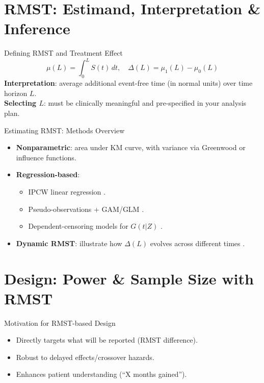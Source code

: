 \documentclass{beamer}
\begin{document}
\section{RMST: Estimand, Interpretation \& Inference}

\begin{frame}{Defining RMST and Treatment Effect}
\[
\mu(L)=\int_0^L S(t)\,dt,\quad \Delta(L)=\mu_1(L)-\mu_0(L)
\]
\textbf{Interpretation}: average additional event-free time (in normal units) over time horizon \(L\).\\
\textbf{Selecting \(L\)}: must be clinically meaningful and pre-specified in your analysis plan.
\end{frame}

\begin{frame}{Estimating RMST: Methods Overview}
\begin{itemize}
  \item \textbf{Nonparametric}: area under KM curve, with variance via Greenwood or influence functions.
  \item \textbf{Regression-based}:
    \begin{itemize}
      \item IPCW linear regression \cite{Tian2014}.
      \item Pseudo-observations + GAM/GLM \cite{Andersen09, Goetghebeur2013}.
      \item Dependent-censoring models for \(G(t|Z)\) \cite{Wang2018}.
    \end{itemize}
  \item \textbf{Dynamic RMST}: illustrate how \(\Delta(L)\) evolves across different times \cite{DynamicRMST2020}.
\end{itemize}
\end{frame}

\section{Design: Power \& Sample Size with RMST}

\begin{frame}{Motivation for RMST-based Design}
\begin{itemize}
  \item Directly targets what will be reported (RMST difference).
  \item Robust to delayed effects/crossover hazards.
  \item Enhances patient understanding (“X months gained”).
\end{itemize}
\end{frame}
\end{document}
